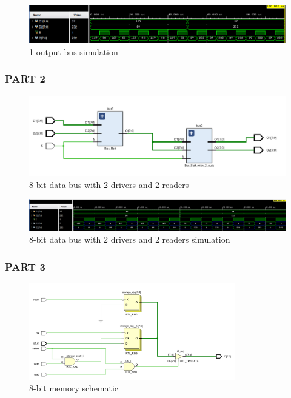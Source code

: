 \documentclass[pdftex,12pt,a4paper]{article}
\begin{document}
    \begin{figure}[H]
    	\centering
    	\includegraphics[width=1\textwidth]{simulations/bus_sim.png}	
    	\caption{1 output bus simulation}
    	\label{1 output bus simulation}
    \end{figure}
    


\hypertarget{hype2}{}
\subsubsection{PART 2}
\begin{figure}[H]
    	\centering
    	\includegraphics[width=1\textwidth]{schematic/part2_design.png}	
    	\caption{ 8-bit data bus with 2 drivers and 2 readers}
    	\label{ 8-bit data bus with 2 drivers and 2 readers}
    \end{figure}
    
    \begin{figure}[H]
    	\centering
    	\includegraphics[width=1\textwidth]{simulations/part2_result.png}	
    	\caption{8-bit data bus with 2 drivers and 2 readers simulation}
    	\label{8-bit data bus with 2 drivers and 2 readers simulation}
    \end{figure}


\hypertarget{hype3}{}
\subsubsection{PART 3}
\begin{figure}[H]
    	\centering
    	\includegraphics[width=0.8\textwidth]{schematic/8bit_schem.png}	
    	\caption{8-bit memory schematic}
    	\label{8-bit memory schematic}
    \end{figure}
    
\end{document}
